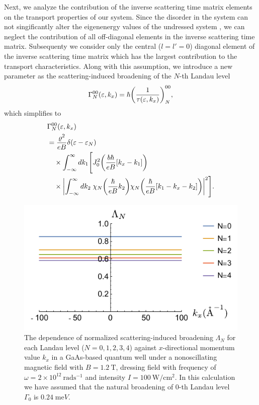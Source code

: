 Next, we analyze the contribution of the inverse scattering time matrix elements on the transport properties of our system.
Since the disorder in the system can not singificantly alter the eigenenergy values of the undressed system \cite{wackerl20}, we can neglect the contribution of all off-diagonal elements in the inverse scattering time matrix. Subsequenty we consider only the central (${l=l'=0}$) diagonal element of the inverse scattering time matrix which has the largest contribution to the transport characteristics. Along with this assumption, we introduce a new parameter as the scattering-induced broadening of the $N$-th Landau level \cite{dini16,endo09}
\begin{equation} \label{eq_14}
 \Gamma^{00}_{N}(\varepsilon,k_x) = \hbar \qty(\frac{1}{\tau(\varepsilon,k_x)})^{00}_{N},
\end{equation}
which simplifies to
\begin{equation} \label{eq_15}
 \begin{aligned}
   &\Gamma^{00}_{N} (\varepsilon,k_x) \\
   & =
   \frac { \varrho^2}{eB}
   \delta(\varepsilon - \varepsilon_{N}) \\
   & \quad\times
   \int_{-\infty}^{\infty} d k_1 \Bigg[
   J_0^2\qty(\frac{b\hbar}{eB}[{k}_x - k_1])
   \\
   & \quad\times
   \qty|
   \int_{-\infty}^{\infty} dk_2 \;
   {\chi}_{N}\qty(\frac{\hbar}{eB}k_2)
   {\chi}_{N}\qty(\frac{\hbar}{eB} \qty[k_1 - {k}_x - k_2])|^2\Bigg].
 \end{aligned}
\end{equation}

\begin{figure}[t]
\includegraphics[scale=0.68]{figures/fig_3}
\caption{\label{fig_3} The dependence of normalized scattering-induced broadening $\Lambda_N$ for each Landau level ($N =0,1,2,3,4$) against $x$-directional momentum value $k_x$ in a GaAs-based quantum well under a nonoscillating magnetic field with $B = 1.2~\text{T}$, dressing field with frequency of $\omega =2\times10^{12}~\text{rad}\text{s}^{-1}$ and intensity $I =100~\text{W}/\text{cm}^{2}$.
In this calculation we have assumed that the natural  broadening of $0$-th Landau level $\Gamma_0$ is $0.24\;\text{me}V$.}
\end{figure}


